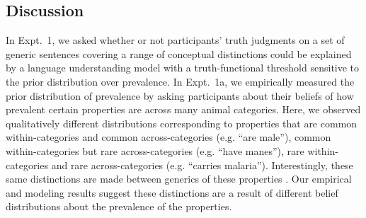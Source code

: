 \documentclass[10pt,letterpaper]{article}
\begin{document}


%

\subsection{Discussion}

In Expt.~1, we asked whether or not participants' truth judgments on a set of generic sentences covering a range of conceptual distinctions could be explained by a language understanding model with a truth-functional threshold sensitive to the prior distribution over prevalence. 
In Expt.~1a, we empirically measured the prior distribution of prevalence by asking participants about their beliefs of how prevalent certain properties are across many animal categories. 
Here, we observed qualitatively different distributions corresponding to properties that are common within-categories and common across-categories (e.g. ``are male''), common within-categories but rare across-categories (e.g. ``have manes''), rare within-categories and rare across-categories (e.g. ``carries malaria''). Interestingly, these same distinctions are made between generics of these properties \cite{Prasada2013}. 
Our empirical and modeling results suggest these distinctions are a result of different belief distributions about the prevalence of the properties.
\end{document}
